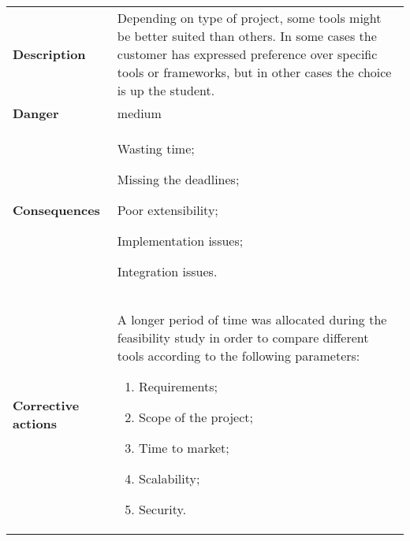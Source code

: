 \renewcommand*{\arraystretch}{1.6}
\begin{longtable}{ l | p{11cm}}
	\hline
	\rowcolor{Gray}
	\multicolumn{2}{c}{Choice of Technologies} \\
	\hline
	\textbf{Description} & Depending on type of project, some tools might be better suited than others. In some cases the customer has expressed preference over specific tools or frameworks, but in other cases the choice is up the student. \\
	\textbf{Danger} & medium \\
	\textbf{Consequences} & \begin{enumerate*}[label=(\arabic*.), itemjoin={\newline}]
		\item Wasting time;
		\item Missing the deadlines;
		\item Poor extensibility;
		\item Implementation issues;
		\item Integration issues.
	\end{enumerate*} \\
	\textbf{Corrective actions} & A longer period of time was allocated during the feasibility study in order to compare different tools according to the following parameters: 
	\begin{enumerate}[label=(\arabic*.), itemjoin={\newline}]
		\item Requirements;
		\item Scope of the project;
		\item Time to market;
		\item Scalability;
		\item Security.
	\end{enumerate} \\
\end{longtable}


